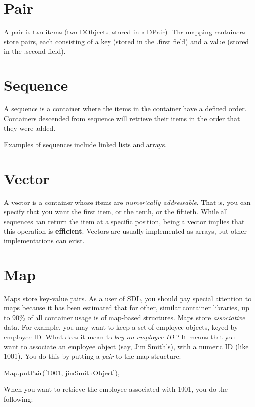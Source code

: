 \documentclass{report}
\begin{document}
\section{Pair}

A pair is two items (two DObjects, stored in a DPair).  The mapping
containers store pairs, each consisting of a key (stored in the .first
field) and a value (stored in the .second field).

\section{Sequence}

A sequence is a container where the items in the container have a defined
order. Containers descended from sequence will retrieve their items in the
order that they were added.

Examples of sequences include linked lists and arrays.

\section{Vector}

A vector is a container whose items are \emph{numerically addressable}. That
is, you can specify that you want the first item, or the tenth, or the
fiftieth.  While all sequences can return the item at a specific position,
being a vector implies that this operation is \textbf{efficient}. Vectors
are usually implemented as arrays, but other implementations can exist.

\section{Map}

Maps store key-value pairs. As a user of SDL, you should pay special
attention to maps because it has been estimated that for other, similar
container libraries, up to 90\% of all container usage is of map-based
structures. Maps store \emph{associative} data. For example, you may want to
keep a set of employee objects, keyed by employee ID. What does it mean to
\emph{key on employee ID} ? It means that you want to associate an employee
object (say, Jim Smith's), with a numeric ID (like 1001). You do this 
by putting a \emph{pair} to the map structure:

Map.putPair([1001, jimSmithObject]);

When you want to retrieve the employee associated with 1001, 
you do the following:
\end{document}
